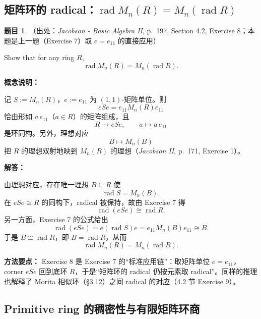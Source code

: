 \documentclass[a4paper]{ctexart}
\theoremstyle{definition}
\newtheorem{example}{题目}[section]
\theoremstyle{analysis}
\theoremstyle{plain}
\begin{document}
\subsection{\texorpdfstring{矩阵环的 radical：\(\operatorname{rad}M_n(R)=M_n(\operatorname{rad}R)\)}{矩阵环的 radical 公式}}\label{subsec:problem-rad-matrix-ring}

\begin{example}
（出处：\textit{Jacobson - Basic Algebra II}, p.~197, Section 4.2, Exercise 8；本题是上一题（Exercise 7）取 \(e=e_{11}\) 的直接应用）

Show that for any ring \(R\),
\[
  \operatorname{rad}M_n(R)=M_n(\operatorname{rad}R).
\]

\textbf{概念说明：}

记 \(S:=M_n(R)\)，\(e:=e_{11}\) 为 \((1,1)\)-矩阵单位。则
\[
  eSe=e_{11}M_n(R)e_{11}
\]
恰由形如 \(a\,e_{11}\)（\(a\in R\)）的矩阵组成，且
\[
  R\longrightarrow eSe,\qquad a\longmapsto a\,e_{11}
\]
是环同构。另外，理想对应
\[
  B\longmapsto M_n(B)
\]
把 \(R\) 的理想双射地映到 \(M_n(R)\) 的理想（\textit{Jacobson II}, p.~171, Exercise 1）。

\textbf{解答：}

由理想对应，存在唯一理想 \(B\subseteq R\) 使
\[
  \operatorname{rad}S=M_n(B).
\]
在 \(eSe\cong R\) 的同构下，radical 被保持，故由 Exercise 7 得
\[
  \operatorname{rad}(eSe)\cong\operatorname{rad}R.
\]
另一方面，Exercise 7 的公式给出
\[
  \operatorname{rad}(eSe)=e(\operatorname{rad}S)e=e_{11}M_n(B)e_{11}\cong B.
\]
于是 \(B\cong\operatorname{rad}R\)，即 \(B=\operatorname{rad}R\)，从而
\[
  \operatorname{rad}M_n(R)=M_n(\operatorname{rad}R).
\]

\textbf{方法要点：}
Exercise 8 是 Exercise 7 的“标准应用链”：取矩阵单位 \(e=e_{11}\)，corner \(eSe\) 回到底环 \(R\)，于是“矩阵环的 radical 仍按元素取 radical”。同样的推理也解释了 Morita 相似环（\S 3.12）之间 radical 的对应（4.2 节 Exercise 9）。
\end{example}

\subsection{Primitive ring 的稠密性与有限矩阵环商}\label{subsec:problem-density-matrix-image}
\end{document}
